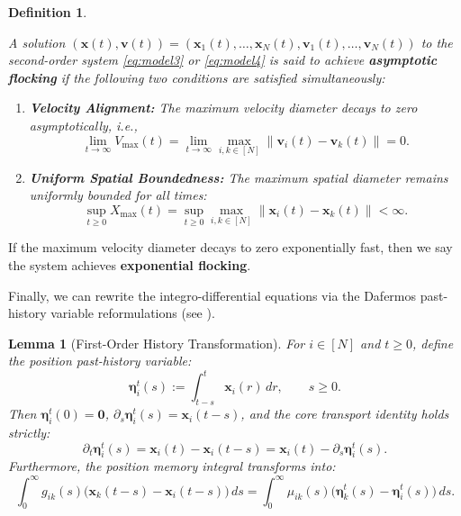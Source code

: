 \documentclass[11pt]{amsart}
\newtheorem{lemma}{Lemma}[section]
\newtheorem{definition}{Definition}[section]
\numberwithin{equation}{section}
\begin{document}
\begin{definition}\label{def:flocking}
{\rm
A solution $(\boldsymbol{x}(t), \boldsymbol{v}(t)) = (\boldsymbol{x}_1(t), \ldots, \boldsymbol{x}_N(t), \boldsymbol{v}_1(t), \ldots, \boldsymbol{v}_N(t))$ to the second-order system \eqref{eq:model3} or \eqref{eq:model4} is said to achieve \textbf{asymptotic flocking} if the following two conditions are satisfied simultaneously:
\begin{enumerate}
    \item [\rm (i)] \textbf{Velocity Alignment:} The maximum velocity diameter decays to zero asymptotically, i.e.,
    \begin{equation*}
    	\lim_{t \to \infty}
    V_{\max}(t) = 	\lim_{t \to \infty}\max_{i,k\in[N]} \|\boldsymbol{v}_i(t) - \boldsymbol{v}_k(t)\| =0.
    \end{equation*}
    \item [\rm (ii)] \textbf{Uniform Spatial Boundedness:} The maximum spatial diameter remains uniformly bounded for all times:
    \begin{equation*}
    \sup_{t \ge 0} X_{\max}(t) = \sup_{t \ge 0} \max_{i,k\in[N]} \|\boldsymbol{x}_i(t) - \boldsymbol{x}_k(t)\| < \infty.
    \end{equation*}
\end{enumerate}
}
\end{definition}
If the maximum velocity diameter decays to zero exponentially fast,
then we say the system achieves \textbf{exponential flocking}.

Finally, we can rewrite  the integro-differential equations via the Dafermos past-history variable reformulations (see \cite{Dafermos1970}).

\begin{lemma}[First-Order History Transformation]\label{lem:uncoupled_transform_1st}
For $i \in [N]$ and $t \ge 0$, define the position past-history variable:
\begin{equation} \label{eq:eta_uncoupled}
\boldsymbol{\eta}_i^t(s) := \int_{t-s}^{t} \boldsymbol{x}_i(r)\,dr, \qquad s \ge 0.
\end{equation}
Then $\boldsymbol{\eta}_i^t(0) = \mathbf{0}$, $\partial_s \boldsymbol{\eta}_i^t(s) = \boldsymbol{x}_i(t-s)$, and the core transport identity holds strictly:
\begin{equation}\label{eq:transport_uncoupled}
\partial_t \boldsymbol{\eta}_i^t(s) = \boldsymbol{x}_i(t) - \boldsymbol{x}_i(t-s) = \boldsymbol{x}_i(t) - \partial_s \boldsymbol{\eta}_i^t(s).
\end{equation}
Furthermore, the position memory integral transforms into:
\begin{equation*}\label{eq:ibp_uncoupled}
\int_{0}^{\infty} g_{ik}(s)\bigl(\boldsymbol{x}_k(t-s)-\boldsymbol{x}_i(t-s)\bigr)\,ds = \int_0^\infty \mu_{ik}(s) \bigl(\boldsymbol{\eta}_k^t(s) - \boldsymbol{\eta}_i^t(s)\bigr)\,ds.
\end{equation*}
\end{lemma}
\end{document}
